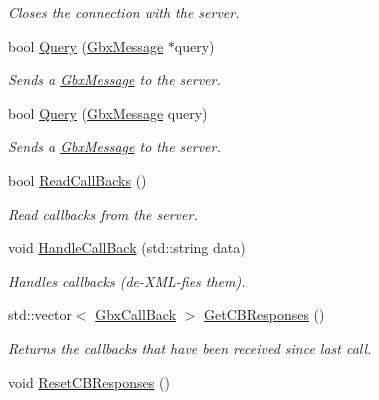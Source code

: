 \begin{DoxyCompactItemize}
\begin{DoxyCompactList}\small\item\em Closes the connection with the server. \end{DoxyCompactList}\item 
bool \hyperlink{classGbxRemote_abf869640136958fc4756b3a60275a285}{Query} (\hyperlink{classGbxMessage}{Gbx\-Message} $\ast$query)
\begin{DoxyCompactList}\small\item\em Sends a \hyperlink{classGbxMessage}{Gbx\-Message} to the server. \end{DoxyCompactList}\item 
bool \hyperlink{classGbxRemote_a8ecc0e0625a8dca310cebd78bd2b3c7e}{Query} (\hyperlink{classGbxMessage}{Gbx\-Message} query)
\begin{DoxyCompactList}\small\item\em Sends a \hyperlink{classGbxMessage}{Gbx\-Message} to the server. \end{DoxyCompactList}\item 
bool \hyperlink{classGbxRemote_ac595861af2f4d7349ce3841f0758507d}{Read\-Call\-Backs} ()
\begin{DoxyCompactList}\small\item\em Read callbacks from the server. \end{DoxyCompactList}\item 
void \hyperlink{classGbxRemote_a5bd6e1dc2118f7e369e72592b3c9322a}{Handle\-Call\-Back} (std\-::string data)
\begin{DoxyCompactList}\small\item\em Handles callbacks (de-\/\-X\-M\-L-\/fies them). \end{DoxyCompactList}\item 
\hypertarget{classGbxRemote_a1ae6ff7eddcccdeda59af2316d053aae}{std\-::vector$<$ \hyperlink{classGbxCallBack}{Gbx\-Call\-Back} $>$ \hyperlink{classGbxRemote_a1ae6ff7eddcccdeda59af2316d053aae}{Get\-C\-B\-Responses} ()}\label{classGbxRemote_a1ae6ff7eddcccdeda59af2316d053aae}

\begin{DoxyCompactList}\small\item\em Returns the callbacks that have been received since last call. \end{DoxyCompactList}\item 
\hypertarget{classGbxRemote_a81ba62f042948610a3cf720316e22076}{void \hyperlink{classGbxRemote_a81ba62f042948610a3cf720316e22076}{Reset\-C\-B\-Responses} ()}\label{classGbxRemote_a81ba62f042948610a3cf720316e22076}


\end{DoxyCompactItemize}

